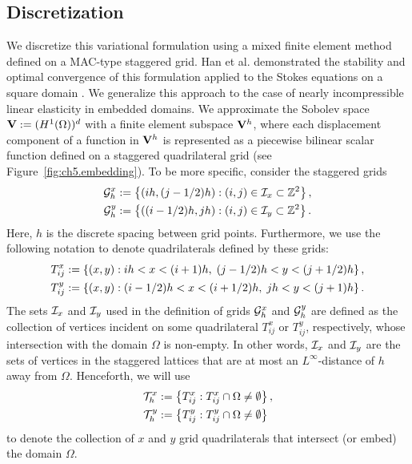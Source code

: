 \subsection{Discretization} \label{sec:ch5.discretization}

We discretize this variational formulation using a mixed finite element method defined on a MAC-type staggered grid. Han et al. demonstrated the stability and optimal convergence of this formulation applied to the Stokes equations on a square domain \cite{Han.Houde98}. We generalize this approach to the case of nearly incompressible linear elasticity in embedded domains. We approximate the Sobolev space $\mathbf{V} := (H^1(\Omega))^d$ with a finite element subspace $\mathbf{V}^h$, where each displacement component of a function in $\mathbf{V}^h$ is represented as a piecewise bilinear scalar function defined on a staggered quadrilateral grid (see Figure~\ref{fig:ch5.embedding}). To be more specific, consider the staggered grids
\begin{align*}
\mathcal{G}^x_h & := \left\lbrace  (ih, (j-1/2)h) : (i,j) \in \mathcal{I}_x \subset \mathbb{Z}^2  \right\rbrace, \\
\mathcal{G}^y_h & := \left\lbrace  ((i-1/2)h, jh) : (i,j) \in \mathcal{I}_y \subset \mathbb{Z}^2  \right\rbrace.
\end{align*}
Here, $h$ is the discrete spacing between grid points. Furthermore, we use the following notation to denote quadrilaterals defined by these grids:
\begin{align*}
T^x_{ij} & := \left\lbrace  (x,y) : ih < x < (i+1)h, \; (j-1/2)h < y < (j+1/2)h  \right\rbrace, \\
T^y_{ij} & := \left\lbrace  (x,y) : (i-1/2)h < x < (i+1/2)h, \; jh < y < (j+1)h  \right\rbrace.
\end{align*}
The sets $\mathcal{I}_x$ and $\mathcal{I}_y$ used in the definition of grids $\mathcal{G}^x_h$ and $\mathcal{G}^y_h$ are defined as the collection of vertices incident on some quadrilateral $T^x_{ij}$ or $T^y_{ij}$, respectively, whose intersection with the domain $\Omega$ is non-empty. In other words, $\mathcal{I}_x$ and $\mathcal{I}_y$ are the sets of vertices in the staggered lattices that are at most an $L^{\infty}$-distance of $h$ away from $\Omega$. Henceforth, we will use
\begin{align*}
\mathcal{T}^x_h & := \left\lbrace  T^x_{ij} : T^x_{ij} \cap \Omega \neq \emptyset  \right\rbrace, \\
\mathcal{T}^y_h & := \left\lbrace  T^y_{ij} : T^y_{ij} \cap \Omega \neq \emptyset  \right\rbrace
\end{align*}
to denote the collection of $x$ and $y$ grid quadrilaterals that intersect (or embed) the domain $\Omega$.

